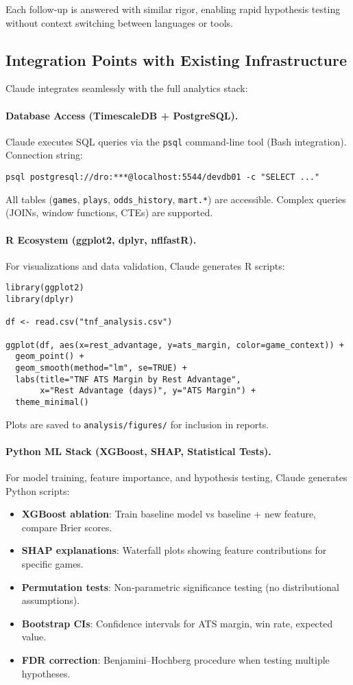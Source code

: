 Each follow‑up is answered with similar rigor, enabling rapid hypothesis testing without context switching between languages or tools.

\subsection{Integration Points with Existing Infrastructure}
\label{subsec:integration_points}

Claude integrates seamlessly with the full analytics stack:

\paragraph{Database Access (TimescaleDB + PostgreSQL).}
Claude executes SQL queries via the \texttt{psql} command‑line tool (Bash integration). Connection string:
\begin{verbatim}
psql postgresql://dro:***@localhost:5544/devdb01 -c "SELECT ..."
\end{verbatim}
All tables (\texttt{games}, \texttt{plays}, \texttt{odds\_history}, \texttt{mart.*}) are accessible. Complex queries (JOINs, window functions, CTEs) are supported.

\paragraph{R Ecosystem (ggplot2, dplyr, nflfastR).}
For visualizations and data validation, Claude generates R scripts:
\begin{verbatim}
library(ggplot2)
library(dplyr)

df <- read.csv("tnf_analysis.csv")

ggplot(df, aes(x=rest_advantage, y=ats_margin, color=game_context)) +
  geom_point() +
  geom_smooth(method="lm", se=TRUE) +
  labs(title="TNF ATS Margin by Rest Advantage",
       x="Rest Advantage (days)", y="ATS Margin") +
  theme_minimal()
\end{verbatim}
Plots are saved to \texttt{analysis/figures/} for inclusion in reports.

\paragraph{Python ML Stack (XGBoost, SHAP, Statistical Tests).}
For model training, feature importance, and hypothesis testing, Claude generates Python scripts:
\begin{itemize}
\item \textbf{XGBoost ablation}: Train baseline model vs baseline + new feature, compare Brier scores.
\item \textbf{SHAP explanations}: Waterfall plots showing feature contributions for specific games.
\item \textbf{Permutation tests}: Non‑parametric significance testing (no distributional assumptions).
\item \textbf{Bootstrap CIs}: Confidence intervals for ATS margin, win rate, expected value.
\item \textbf{FDR correction}: Benjamini--Hochberg procedure when testing multiple hypotheses.
\end{itemize}

